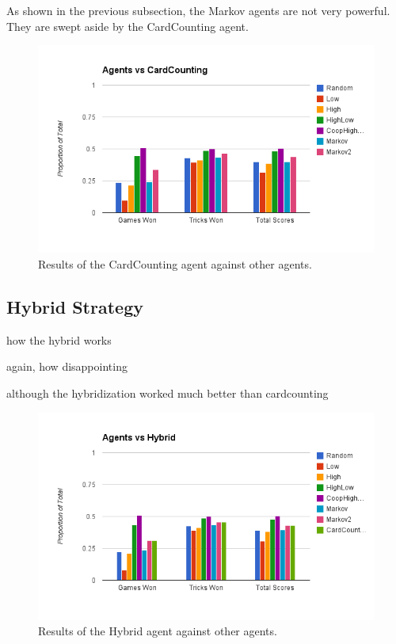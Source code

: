 As shown in the previous subsection, the Markov agents are not very powerful. They are swept aside by the CardCounting agent.

\begin{figure}[h]
    \centering
    \includegraphics[scale=0.5]{data/cardcounting.png}
    \caption{Results of the CardCounting agent against other agents.}
    \label{fig:results_cardcounting}
\end{figure}


\subsection{Hybrid Strategy}

how the hybrid works


again, how disappointing


although the hybridization worked much better than cardcounting

\begin{figure}[h]
    \centering
    \includegraphics[scale=0.5]{data/hybrid.png}
    \caption{Results of the Hybrid agent against other agents.}
    \label{fig:results_hybrid}
\end{figure}

